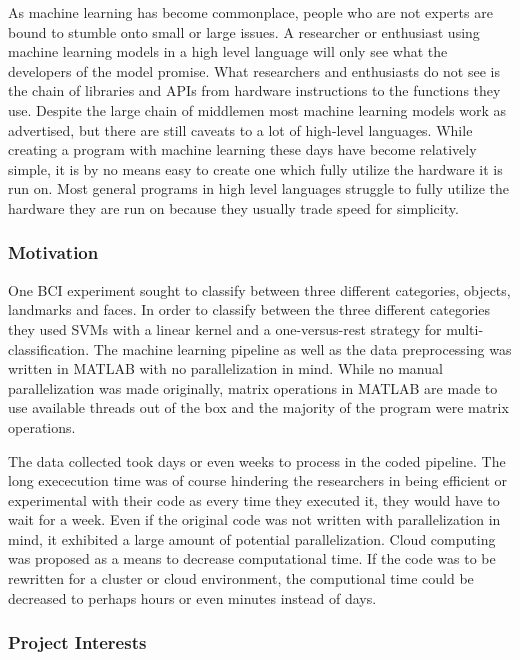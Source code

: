 \documentclass[12pt, a4paper]{article}
\begin{document}
As machine learning has become commonplace, people who are not experts are bound to stumble onto small or large issues.
A researcher or enthusiast using machine learning models in a high level language will only see what the developers of the model promise.
What researchers and enthusiasts do not see is the chain of libraries and APIs from hardware instructions to the functions they use.
Despite the large chain of middlemen most machine learning models work as advertised, but there are still caveats to a lot of high-level languages. 
While creating a program with machine learning these days have become relatively simple, it is by no means easy to create one which fully utilize the hardware it is run on.
Most general programs in high level languages struggle to fully utilize the hardware they are run on because they usually trade speed for simplicity.

\subsubsection{Motivation}

One BCI experiment sought to classify between three different categories, objects, landmarks and faces.
In order to classify between the three different categories they used SVMs with a linear kernel and a one-versus-rest strategy for multi-classification.
The machine learning pipeline as well as the data preprocessing was written in MATLAB with no parallelization in mind.
While no manual parallelization was made originally, matrix operations in MATLAB are made to use available threads out of the box and the majority of the program were matrix operations.

The data collected took days or even weeks to process in the coded pipeline.
The long exececution time was of course hindering the researchers in being efficient or experimental with their code as every time they executed it, they would have to wait for a week.
Even if the original code was not written with parallelization in mind, it exhibited a large amount of potential parallelization.
Cloud computing was proposed as a means to decrease computational time.
If the code was to be rewritten for a cluster or cloud environment, the computional time could be decreased to perhaps hours or even minutes instead of days.

\subsubsection{Project Interests}
\end{document}
